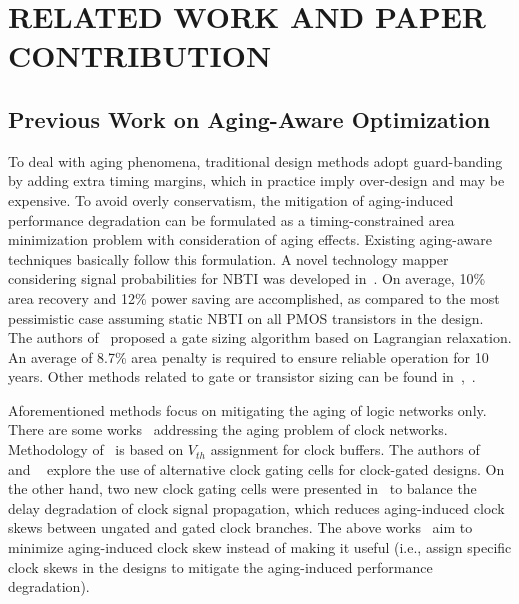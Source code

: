 \section{RELATED WORK AND PAPER CONTRIBUTION}
\label{sec:related}
\subsection{Previous Work on Aging-Aware Optimization}
\label{subsec:rw}
To deal with aging phenomena, traditional design methods adopt guard-banding by adding extra timing margins, which in practice imply over-design and may be expensive. To avoid overly conservatism, the mitigation of aging-induced performance degradation can be formulated as a timing-constrained area minimization problem with consideration of aging effects. Existing aging-aware techniques basically follow this formulation. A novel technology mapper considering signal probabilities for NBTI was developed in~\cite{kumar2007nbti}. On average, 10\% area recovery and 12\% power saving are accomplished, as compared to the most pessimistic case assuming static NBTI on all PMOS transistors in the design. The authors of~\cite{paul2006temporal} proposed a gate sizing algorithm based on Lagrangian relaxation. An average of 8.7\% area penalty is required to ensure reliable operation for 10 years. Other methods related to gate or transistor sizing can be found in~\cite{kang2007efficient},~\cite{yang2007combating}.

Aforementioned methods focus on mitigating the aging of logic networks only. There are some works~\cite{huang2013low, chakraborty2013skew,chen2013novel} addressing the aging problem of clock networks. Methodology of~\cite{chen2013novel} is based on $V_{th}$ assignment for clock buffers. The authors of ~\cite{huang2013low} and ~\cite{chakraborty2013skew} explore the use of alternative clock gating cells for clock-gated designs. On the other hand, two new clock gating cells were presented in~\cite{lai2014bti} to balance the delay degradation of clock signal propagation, which reduces aging-induced clock skews between ungated and gated clock branches. The above works~\cite{huang2013low, chakraborty2013skew,chen2013novel,lai2014bti} aim to minimize aging-induced clock skew instead of making it useful (i.e., assign specific clock skews in the designs to mitigate the aging-induced performance degradation).

